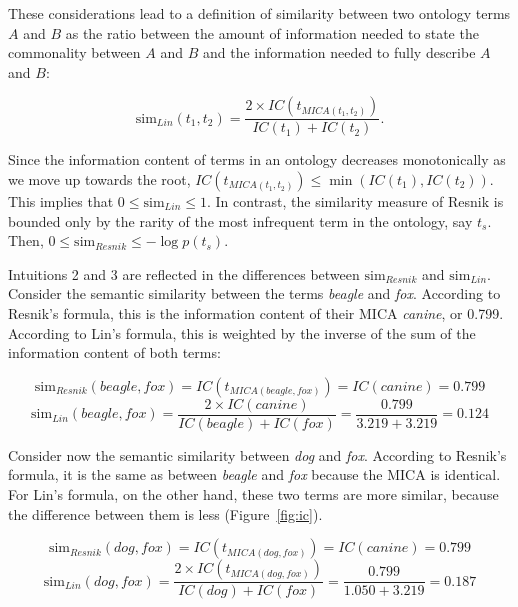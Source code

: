 \documentclass{article}
\begin{document}
These considerations lead to a definition of similarity between two 
ontology terms $A$ and $B$ as the ratio 
between the amount of information needed to state the commonality 
between $A$ and $B$ and the information needed to fully describe $A$ 
and $B$: 
 
\begin{equation} 
\mathrm{sim}_{Lin}(t_1,t_2) = \dfrac{2\times IC(t_{MICA(t_1,t_2)})}{IC(t_1) + IC(t_2)}. 
\label{eq:semsim-lin} 
\end{equation} 
  
Since the information content of terms in 
an ontology decreases monotonically as we move up towards the root, 
$IC(t_{MICA(t_1,t_2)}) \leq \min( IC(t_1),IC(t_2))$. This implies that 
$0\leq \mathrm{sim}_{Lin} \leq 1$. In contrast, the similarity measure 
of Resnik is bounded only by the rarity of the most infrequent term 
in the ontology, say $t_s$. Then, $0\leq \mathrm{sim}_{Resnik} \leq 
-\log p(t_s)$. 
 
Intuitions 2 and 3 are reflected in the differences between 
$\mathrm{sim}_{Resnik}$ and $\mathrm{sim}_{Lin}$. Consider the 
semantic similarity between the terms \textit{beagle} and \textit{fox}. 
According to Resnik's formula, this is the information content of 
their MICA \textit{canine}, or 0.799. According to Lin's formula, this 
is weighted by the inverse of the sum of the information content of 
both terms: 
 
\begin{equation*} 
\mathrm{sim}_{Resnik}(beagle,fox) = 
IC(t_{MICA(beagle,fox)})=IC(canine)=0.799  
\end{equation*} 
\begin{equation*} 
\mathrm{sim}_{Lin}(beagle,fox) = 
\dfrac{2\times IC(canine)}{IC(beagle) + IC(fox)} = \dfrac{0.799}{3.219+3.219}=0.124 
\end{equation*} 
 
Consider now the semantic similarity between \textit{dog} and 
\textit{fox}. According to Resnik's formula, it is the same as between 
\textit{beagle} and \textit{fox} because the MICA is 
identical. For Lin's formula, on the other hand, these two terms are 
more similar, because the difference between them is less 
(Figure~\ref{fig:ic}). 
 
\begin{equation*} 
\mathrm{sim}_{Resnik}(dog,fox) = 
IC(t_{MICA(dog,fox)})=IC(canine)=0.799  
\end{equation*} 
\begin{equation*} 
\mathrm{sim}_{Lin}(dog,fox) = 
\dfrac{2\times IC(t_{MICA(dog,fox)})}{IC(dog) + IC(fox)} = \dfrac{0.799}{1.050+3.219}=0.187 
\end{equation*} 
 
\end{document}
